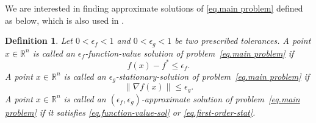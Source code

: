 \documentclass{article}
\newtheorem{definition}[theorem]{Definition}
\numberwithin{equation}{section}
\numberwithin{equation}{section}
\begin{document}
We are interested in finding approximate solutions of \eqref{eq.main problem} defined as below, which is also used in \citet{monteiro2013accelerated}.
\begin{definition}
    \label{def.approximate solution}
    Let $0<\epsilon_f<1$ and $0<\epsilon_g<1$ be two prescribed tolerances. A point $x\in\mathbb{R}^n$ is called an
    $\epsilon_f$-function-value solution of problem~\eqref{eq.main problem} if
    \begin{equation}\label{eq.function-value-sol}
        f(x)-f^* \leq \epsilon_f.
    \end{equation}
    A point $x\in\mathbb{R}^n$ is called an
    $\epsilon_g$-stationary-solution of problem~\eqref{eq.main problem} if
    \begin{equation}\label{eq.first-order-stat}
        \|\nabla f(x)\| \leq \epsilon_g.
    \end{equation}
    A point $x\in\mathbb{R}^n$ is called an
    $(\epsilon_f,\epsilon_g)$-approximate solution of problem~\eqref{eq.main problem} if it satisfies \eqref{eq.function-value-sol} or \eqref{eq.first-order-stat}.
\end{definition}
\end{document}
